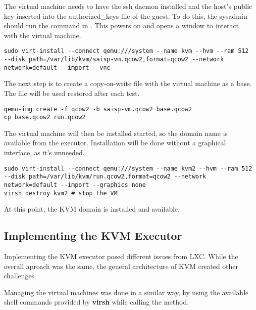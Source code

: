 The virtual machine needs to have the ssh daemon installed and the host's
public key inserted into the authorized_keys file of the guest. To do this,
the sysadmin should run the command in .
This powers on and opens a window to interact with the virtual machine.

\lstset{caption=Initial run of the virtual machine, label=lst:kvm-run}
\begin{lstlisting}
sudo virt-install --connect qemu:///system --name kvm --hvm --ram 512 --disk path=/var/lib/kvm/saisp-vm.qcow2,format=qcow2 --network network=default --import --vnc
\end{lstlisting}


The next step is to create a copy-on-write file with the virtual machine as a base.
The file will be used restored after each test.

\lstset{caption=Creating the Target File, label=lst:kvm-base}
\begin{lstlisting}
qemu-img create -f qcow2 -b saisp-vm.qcow2 base.qcow2
cp base.qcow2 run.qcow2
\end{lstlisting}

The virtual machine will then be installed started, so the domain name is available
from the executor. Installation will be done without a graphical interface, 
as it's unneeded.


\lstset{caption=Install the KVM Domain, label=lst:kvm-install}
\begin{lstlisting}
sudo virt-install --connect qemu:///system --name kvm2 --hvm --ram 512 --disk path=/var/lib/kvm/run.qcow2,format=qcow2 --network network=default --import --graphics none
virsh destroy kvm2 # stop the VM
\end{lstlisting}

At this point, the KVM domain is installed and available.

\subsection{Implementing the KVM Executor}
\label{sub-sec:vmc-kvm-executor}

Implementing the KVM executor posed different issues from LXC. While the
overall aproach was the same, the general architecture of KVM created other
challenges. 

Managing the virtual machines was done in a similar way, by using the available
shell commands provided by \textbf{virsh} while calling the  method.

